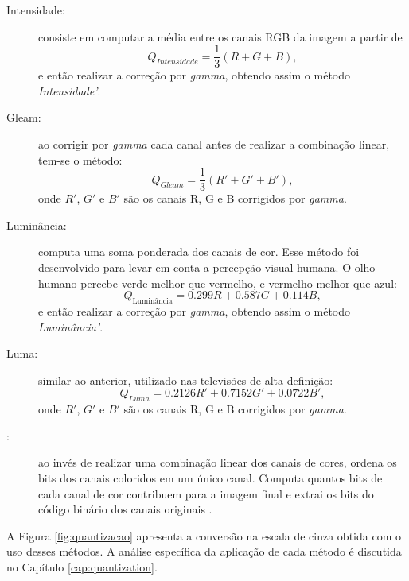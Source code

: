 \begin{description}
\item [Intensidade:] consiste em computar a média entre os canais RGB da imagem a partir de
\begin{equation*}
	Q_{Intensidade} = \frac{1}{3}(R + G + B),
\end{equation*}
\noindent e então realizar a correção por \textit{gamma}, obtendo assim o método \emph{Intensidade'}.

\item [Gleam:] ao corrigir por \textit{gamma} cada canal antes de realizar a combinação linear, tem-se o método:
\begin{equation*}
	Q_{Gleam} = \frac{1}{3}(R' + G' + B'),
\end{equation*}
\noindent onde $R'$, $G'$ e $B'$ são os canais R, G e B corrigidos por \textit{gamma}.

\item [Luminância:] computa uma soma ponderada dos canais de cor. Esse método foi desenvolvido para levar em conta a percepção visual humana. O olho humano percebe verde melhor que vermelho, e vermelho melhor que azul:
\begin{equation*}
	Q_{\text{Luminância}} = 0.299R + 0.587G + 0.114B,
\end{equation*}
\noindent e então realizar a correção por \textit{gamma}, obtendo assim o método \emph{Luminância'}.

\item [Luma:]  similar ao anterior, utilizado nas televisões de alta definição:
\begin{equation*}
	Q_{Luma} = 0.2126R' + 0.7152G' + 0.0722B',
\end{equation*}
\noindent onde $R'$, $G'$ e $B'$ são os canais R, G e B corrigidos por \textit{gamma}.

\item [:] ao invés de realizar uma combinação linear dos canais de cores, ordena os bits dos canais coloridos em um único canal. Computa quantos bits de cada canal de cor contribuem para a imagem final e extrai os bits do código binário dos canais originais \cite{Ponti-Jr2013}.

\end{description}

A Figura \ref{fig:quantizacao} apresenta a conversão na escala de cinza obtida com o uso desses métodos. A análise específica da aplicação de cada método é discutida no Capítulo \ref{cap:quantization}.


